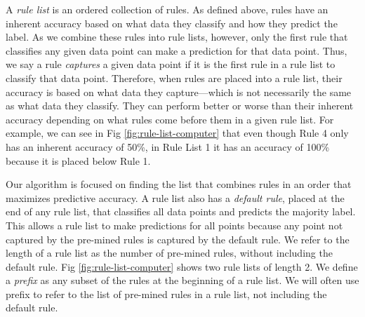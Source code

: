 A \textit{rule list} is an ordered collection of rules.
As defined above, rules have an inherent accuracy based on what data they classify and how they predict the label.
As we combine these rules into rule lists, however, only the first rule that classifies any given data point can make a prediction for that data point.
Thus, we say a rule \textit{captures} a given data point if it is the first rule in a rule list to classify that data point.
Therefore, when rules are placed into a rule list, their accuracy is based on what data they capture---which is not necessarily the same as what data they classify.
They can perform better or worse than their inherent accuracy depending on what rules come before them in a given rule list.
For example, we can see in Fig \ref{fig:rule-list-computer} that even though Rule 4 only has an inherent accuracy of 50\%, in Rule List 1 it has an accuracy of 100\% because it is placed below Rule 1.

Our algorithm is focused on finding the list that combines rules in an order that maximizes predictive accuracy.
A rule list also has a \textit{default rule}, placed at the end of any rule list, that classifies all data points and predicts the majority label.
This allows a rule list to make predictions for all points because any point not captured by the pre-mined rules is captured by the default rule.
We refer to the length of a rule list as the number of pre-mined rules, without including the default rule.
Fig \ref{fig:rule-list-computer} shows two rule lists of length 2.
We define a \textit{prefix} as any subset of the rules at the beginning of a rule list.
We will often use prefix to refer to the list of pre-mined rules in a rule list, not including the default rule.

